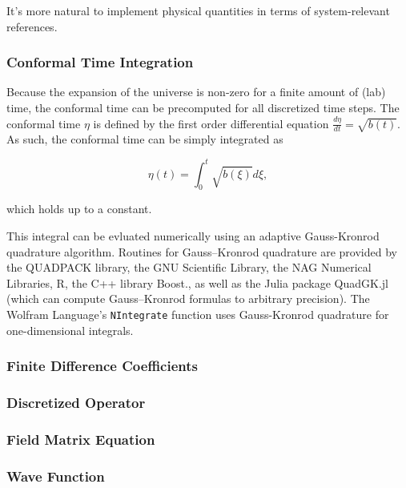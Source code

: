 \documentclass{article}
\begin{document}
            It's more natural to implement physical quantities in terms of system-relevant references.

        \subsubsection{Conformal Time Integration}

            Because the expansion of the universe is non-zero for a finite amount of (lab) time, the conformal time can be precomputed for all discretized time steps.  The conformal time $\eta$ is defined by the first order differential equation $\frac{d\eta}{dt} = \sqrt{b(t)}$.  As such, the conformal time can be simply integrated as 

            \begin{equation}
                \eta(t) = \int_{0}^{t} \sqrt{b(\xi)} d\xi,
            \end{equation}

            which holds up to a constant.

            This integral can be evluated numerically using an adaptive Gauss-Kronrod quadrature algorithm\cite{quadgk}.  Routines for Gauss–Kronrod quadrature are provided by the QUADPACK library, the GNU Scientific Library, the NAG Numerical Libraries, R, the C++ library Boost., as well as the Julia package QuadGK.jl (which can compute Gauss–Kronrod formulas to arbitrary precision).  The Wolfram Language's \verb|NIntegrate| function uses Gauss-Kronrod quadrature for one-dimensional integrals\cite{GKQuad}.

        \subsubsection{Finite Difference Coefficients}

        \subsubsection{Discretized Operator}

        \subsubsection{Field Matrix Equation}

        \subsubsection{Wave Function}
\end{document}
